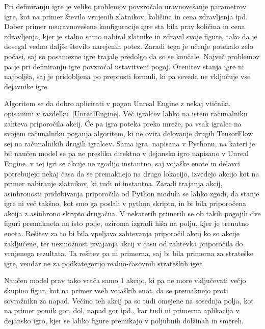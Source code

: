 \documentclass[a4paper, 12pt]{book}
\begin{document}
Pri definiranju igre je veliko problemov povzročalo uravnovešanje parametrov igre, kot na primer število vrnjenih zlatnikov, količina in cena zdravljenja ipd.
Dober primer neuravnovešene konfiguracije igre sta bila prav količina in cena zdravljenja, kjer je stalno samo nabiral zlatnike in zdravil svoje figure, tako da je dosegal vedno daljše število narejenih potez.
Zaradi tega je učenje potekalo zelo počasi, saj so posamezne igre trajale predolgo da so se končale.
Največ problemov pa je pri definiranju igre povzročal ustavitveni pogoj.
Ocenitev stanja igre ni najboljša, saj je pridobljena po preprosti formuli, ki pa seveda ne vključuje vse dejavnike igre.



Algoritem se da dobro aplicirati v pogon Unreal Engine z nekaj vtičniki, opisanimi v razdelku~\ref{UnrealEngine}. Več igralcev lahko na istem računalniku zahteva priporočila akcij. 
Če pa igra poteka preko mreže, pa vsak igralec na svojem računalniku poganja algoritem, ki ne ovira delovanje drugih TensorFlow sej na računalnikih drugih igralcev.
Sama igra, napisana v Pythonu, na kateri je bil naučen model se pa ne preslika direktno v dejansko igro napisano v Unreal Engine.
v tej igri se akcije ne zgodijo instantno, saj vojaške enote in delavci potrebujejo nekaj časa da se premaknejo na drugo lokacijo, izvedejo akcijo kot na primer nabiranje zlatnikov, ki tudi ni instantna.
Zaradi trajanja akcij, asinhronosti pridobivanja priporočila od Python modula se lahko zgodi, da stanje igre ni več takšno, kot smo ga poslali v python skripto, in bi bila priporočena akcija z asinhrono skripto drugačna. 
V nekaterih primerih se ob takih pogojih dve figuri premakneta na isto polje, oziroma izgradi hiša na polju, kjer je trenutno enota. 
Rešitev za to bi bila vpeljava zahtevanja priporočil akcij ko so akcije zaključene, ter nezmožnost izvajanja akcij v času od zahtevka priporočila do vrnjenega rezultata.
Ta rešitev pa ni primerna, saj bi bila primerna za strateške igre, vendar ne za podkategorijo realno-časovnih strateških iger.

Naučen model prav tako vrača samo 1 akcijo, ki pa ne more vključevati večjo skupino figur, kot na primer vseh vojaških enot, da se premaknejo proti sovražniku za napad.
Večino teh akcij pa so tudi omejene na sosednja polja, kot na primer pomik gor, dol, napad gor ipd., kar tudi ni primerna aplikacija v dejansko igro, kjer se lahko figure premikajo v poljubnih dolžinah in smereh.
\end{document}
